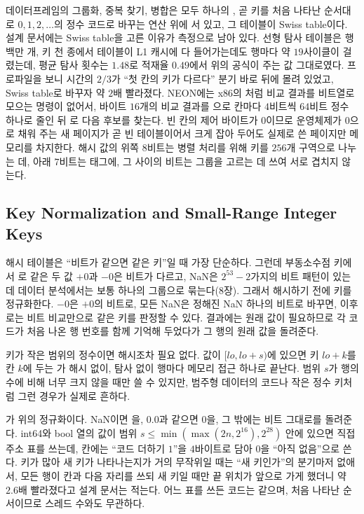 \begin{instardust}
데이터프레임의 그룹화, 중복 찾기, 병합은 모두 하나의 , 곧 키를 처음 나타난 순서대로 $0,1,2,\dots$의 정수 코드로 바꾸는 연산 위에 서 있고, 그 테이블이 Swiss table이다. 설계 문서에는 Swiss table을 고른 이유가 측정으로 남아 있다. 선형 탐사 테이블은 행 백만 개, 키 천 종에서 테이블이 L1 캐시에 다 들어가는데도 행마다 약 $19$사이클이 걸렸는데, 평균 탐사 횟수는 $1.48$로 적재율 $0.49$에서 위의 공식이 주는 값 그대로였다. 프로파일을 보니 시간의 $2/3$가 ``첫 칸의 키가 다르다'' 분기 바로 뒤에 몰려 있었고, Swiss table로 바꾸자 약 $2$배 빨라졌다. NEON에는 x86의 처럼 비교 결과를 비트열로 모으는 명령이 없어서, 바이트 $16$개의 비교 결과를 으로 칸마다 $4$비트씩 $64$비트 정수 하나로 줄인 뒤 로 다음 후보를 찾는다. 빈 칸의 제어 바이트가 $0$이므로 운영체제가 $0$으로 채워 주는 새 페이지가 곧 빈 테이블이어서 크게 잡아 두어도 실제로 쓴 페이지만 메모리를 차지한다. 해시 값의 위쪽 $8$비트는 병렬 처리를 위해 키를 $256$개 구역으로 나누는 데, 아래 $7$비트는 태그에, 그 사이의 비트는 그룹을 고르는 데 쓰여 서로 겹치지 않는다.
\end{instardust}

\subsection{Key Normalization and Small-Range Integer Keys}

해시 테이블은 ``비트가 같으면 같은 키''일 때 가장 단순하다. 그런데 부동소수점 키에서 \code{==}로 같은 두 값 $+0$과 $-0$은 비트가 다르고, NaN은 $2^{53}-2$가지의 비트 패턴이 있는데 데이터 분석에서는 보통 하나의 그룹으로 묶는다(8장). 그래서 해시하기 전에 키를 정규화한다. $-0$은 $+0$의 비트로, 모든 NaN은 정해진 NaN 하나의 비트로 바꾸면, 이후로는 비트 비교만으로 같은 키를 판정할 수 있다. 결과에는 원래 값이 필요하므로 각 코드가 처음 나온 행 번호를 함께 기억해 두었다가 그 행의 원래 값을 돌려준다.

키가 작은 범위의 정수이면 해시조차 필요 없다. 값이 $[lo,lo+s)$에 있으면 키 $lo+k$를 칸 $k$에 두는 가 해시 없이, 탐사 없이 행마다 메모리 접근 하나로 끝난다. 범위 $s$가 행의 수에 비해 너무 크지 않을 때만 쓸 수 있지만, 범주형 데이터의 코드나 작은 정수 키처럼 그런 경우가 실제로 흔하다.

\begin{instardust}
가 위의 정규화이다. NaN이면 을, $0.0$과 같으면 $0$을, 그 밖에는 비트 그대로를 돌려준다. int64와 bool 열의 값이 범위 $s\le\min(\max(2n,2^{16}),2^{28})$ 안에 있으면 직접 주소 표를 쓰는데, 칸에는 ``코드 더하기 $1$''을 $4$바이트로 담아 $0$을 ``아직 없음''으로 쓴다. 키가 많아 새 키가 나타나는지가 거의 무작위일 때는 ``새 키인가''의 분기마저 없애서, 모든 행이 칸과 다음 자리를 쓰되 새 키일 때만 끝 위치가 앞으로 가게 했더니 약 $2.6$배 빨라졌다고 설계 문서는 적는다. 어느 표를 쓰든 코드는 같으며, 처음 나타난 순서이므로 스레드 수와도 무관하다.
\end{instardust}

